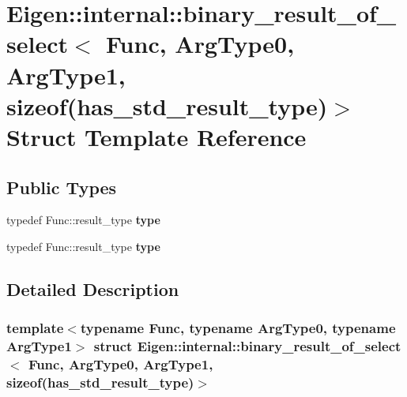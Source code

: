 \hypertarget{struct_eigen_1_1internal_1_1binary__result__of__select_3_01_func_00_01_arg_type0_00_01_arg_type12f7b681b9b0e96643c5ba0b38cf06652}{}\section{Eigen\+:\+:internal\+:\+:binary\+\_\+result\+\_\+of\+\_\+select$<$ Func, Arg\+Type0, Arg\+Type1, sizeof(has\+\_\+std\+\_\+result\+\_\+type)$>$ Struct Template Reference}
\label{struct_eigen_1_1internal_1_1binary__result__of__select_3_01_func_00_01_arg_type0_00_01_arg_type12f7b681b9b0e96643c5ba0b38cf06652}
\subsection*{Public Types}
\begin{DoxyCompactItemize}
\item 
\mbox{\label{struct_eigen_1_1internal_1_1binary__result__of__select_3_01_func_00_01_arg_type0_00_01_arg_type12f7b681b9b0e96643c5ba0b38cf06652_ac805de12b142e814afdbac4aede1dfa5}} 
typedef Func\+::result\+\_\+type {\bfseries type}
\item 
\mbox{\label{struct_eigen_1_1internal_1_1binary__result__of__select_3_01_func_00_01_arg_type0_00_01_arg_type12f7b681b9b0e96643c5ba0b38cf06652_ac805de12b142e814afdbac4aede1dfa5}} 
typedef Func\+::result\+\_\+type {\bfseries type}
\end{DoxyCompactItemize}


\subsection{Detailed Description}
\subsubsection*{template$<$typename Func, typename Arg\+Type0, typename Arg\+Type1$>$\newline
struct Eigen\+::internal\+::binary\+\_\+result\+\_\+of\+\_\+select$<$ Func, Arg\+Type0, Arg\+Type1, sizeof(has\+\_\+std\+\_\+result\+\_\+type)$>$}



